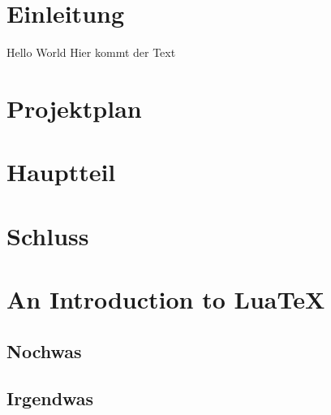 \documentclass[10pt]{report}
\newcommand{\titel}{$Titel der Arbeit}
\newcommand{\desc}{$Name des Leistungsnachweis}
\newcommand{\authors}{$Autoren}
\newcommand{\lecturer}{$Betreuer}
\newcommand{\module}{$Modul oder $Kurs}
\begin{document}

\newpage 

\tableofcontents
\listoffigures
\listoftables

\newpage
\chapter{Einleitung}

Hello World \cite{LUNDY20151057} Hier kommt der Text

\chapter{Projektplan}


\chapter{Hauptteil}

\chapter{Schluss}

\newpage
\appendix
\chapter{An Introduction to Lua\TeX}
\section{Nochwas}
\section{Irgendwas}

\newpage
\printbibliography
\end{document}
